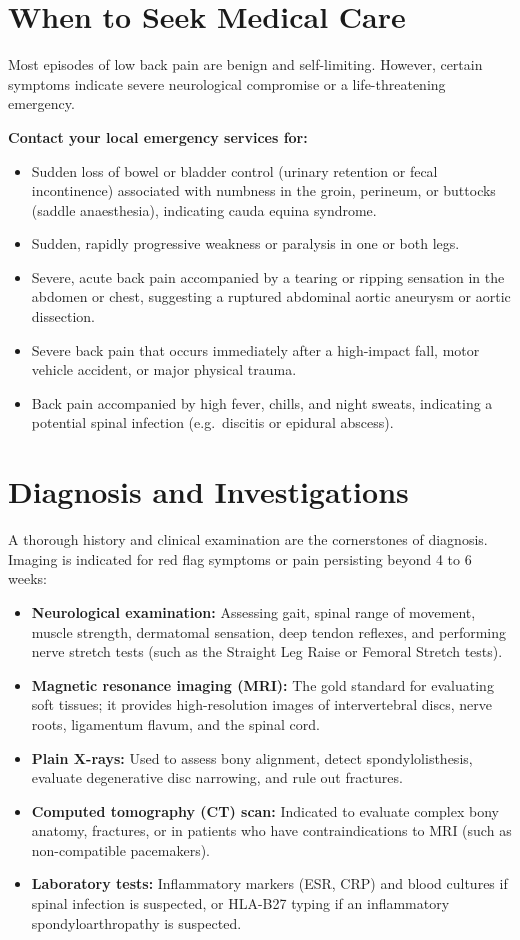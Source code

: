 \section*{When to Seek Medical Care}
Most episodes of low back pain are benign and self-limiting. However, certain symptoms indicate severe neurological compromise or a life-threatening emergency.

\textbf{Contact your local emergency services for:}
\begin{itemize}
    \item Sudden loss of bowel or bladder control (urinary retention or fecal incontinence) associated with numbness in the groin, perineum, or buttocks (saddle anaesthesia), indicating cauda equina syndrome.
    \item Sudden, rapidly progressive weakness or paralysis in one or both legs.
    \item Severe, acute back pain accompanied by a tearing or ripping sensation in the abdomen or chest, suggesting a ruptured abdominal aortic aneurysm or aortic dissection.
    \item Severe back pain that occurs immediately after a high-impact fall, motor vehicle accident, or major physical trauma.
    \item Back pain accompanied by high fever, chills, and night sweats, indicating a potential spinal infection (e.g.\ discitis or epidural abscess).
\end{itemize}

\section*{Diagnosis and Investigations}
A thorough history and clinical examination are the cornerstones of diagnosis. Imaging is indicated for red flag symptoms or pain persisting beyond 4 to 6 weeks:

\begin{itemize}
    \item \textbf{Neurological examination:} Assessing gait, spinal range of movement, muscle strength, dermatomal sensation, deep tendon reflexes, and performing nerve stretch tests (such as the Straight Leg Raise or Femoral Stretch tests).
    \item \textbf{Magnetic resonance imaging (MRI):} The gold standard for evaluating soft tissues; it provides high-resolution images of intervertebral discs, nerve roots, ligamentum flavum, and the spinal cord.
    \item \textbf{Plain X-rays:} Used to assess bony alignment, detect spondylolisthesis, evaluate degenerative disc narrowing, and rule out fractures.
    \item \textbf{Computed tomography (CT) scan:} Indicated to evaluate complex bony anatomy, fractures, or in patients who have contraindications to MRI (such as non-compatible pacemakers).
    \item \textbf{Laboratory tests:} Inflammatory markers (ESR, CRP) and blood cultures if spinal infection is suspected, or HLA-B27 typing if an inflammatory spondyloarthropathy is suspected.
\end{itemize}

